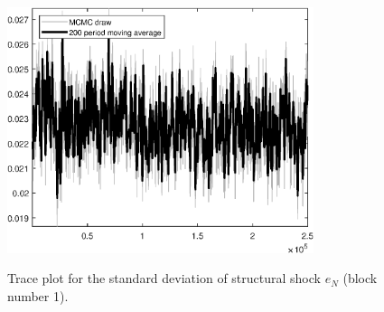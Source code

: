 \begin{figure}[H]
\centering
  \includegraphics[width=0.8\textwidth]{BRS_comovement/graphs/TracePlot_SE_e_N_blck_1}\\
    \caption{Trace plot for the standard deviation of structural shock ${e_N}$ (block number 1).}
\end{figure}
